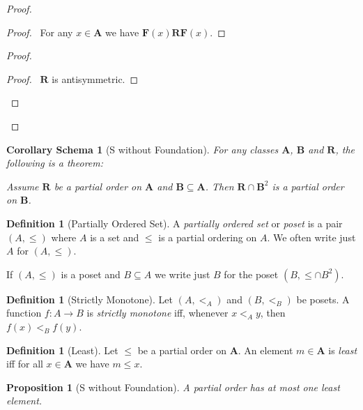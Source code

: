 \documentclass{book}
\let\qed\relax
\newtheorem{prop}[ax]{Proposition}
\newtheorem{cors}{Corollary Schema}[ax]
\theoremstyle{definition}
\newtheorem{df}[ax]{Definition}
\begin{document}
\begin{proof}
\pf
{}
\begin{proof}
	\pf\ For any $x \in \mathbf{A}$ we have $\mathbf{F}(x) \mathbf{R} \mathbf{F}(x)$.
\end{proof}
\begin{proof}
	\begin{proof}
		\pf\ $\mathbf{R}$ is antisymmetric.
	\end{proof}
\end{proof}
\qed
\end{proof}

\begin{cors}[S without Foundation]
\label{cor:subposet}
For any classes $\mathbf{A}$, $\mathbf{B}$ and $\mathbf{R}$, the following is a theorem:

Assume $\mathbf{R}$ be a partial order on $\mathbf{A}$ and $\mathbf{B} \subseteq \mathbf{A}$. Then $\mathbf{R} \cap \mathbf{B}^2$ is a partial order on $\mathbf{B}$.
\end{cors}

\begin{df}[Partially Ordered Set]
A \emph{partially ordered set} or \emph{poset} is a pair $(A, \leq)$ where $A$ is a set and $\leq$ is a partial ordering on $A$. We often write just $A$ for $(A, \leq)$.

If $(A, \leq)$ is a poset and $B \subseteq A$ we write just $B$ for the poset $(B, \leq \cap B^2)$.
\end{df}

\begin{df}[Strictly Monotone]
Let $(A,<_A)$ and $(B, <_B)$ be posets. A function $f : A \rightarrow B$ is \emph{strictly monotone} iff, whenever $x <_A y$, then $f(x) <_B f(y)$.
\end{df}

\begin{df}[Least]
Let $\leq$ be a partial order on $\mathbf{A}$. An element $m \in \mathbf{A}$ is \emph{least} iff for all $x \in \mathbf{A}$ we have $m \leq x$.
\end{df}

\begin{prop}[S without Foundation]
A partial order has at most one least element.
\end{prop}
\end{document}
